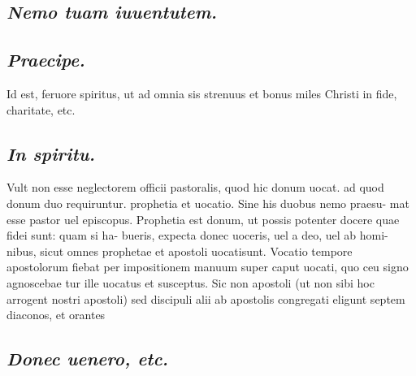 \documentclass{article}
\begin{document}
\begin{pages}
\subsection*{\textit{Nemo tuam iuuentutem. }}
{}
\subsection*{\textit{Praecipe. }}\pstart Id est, feruore spiritus, ut ad omnia sis strenuus et bonus miles Christi in fide, charitate, etc.  \pend
{}
{}
\subsection*{\textit{In spiritu. }}\pstart Vult non esse neglectorem officii pastoralis, quod hic donum uocat. ad quod donum duo requiruntur. prophetia et uocatio. Sine his duobus nemo praesu- mat esse pastor uel episcopus. Prophetia est donum, ut possis potenter docere quae fidei sunt: quam si ha- bueris, expecta donec uoceris, uel a deo, uel ab homi- nibus, sicut omnes prophetae et apostoli uocatisunt. Vocatio tempore apostolorum fiebat per impositionem manuum super caput uocati, quo ceu signo agnoscebae tur ille uocatus et susceptus. Sic non apostoli (ut non sibi hoc arrogent nostri apostoli) sed discipuli alii ab apostolis congregati eligunt septem diaconos, et orantes  \pend
{}
{}
\subsection*{\textit{Donec uenero, etc. }}

\end{pages}
\end{document}
